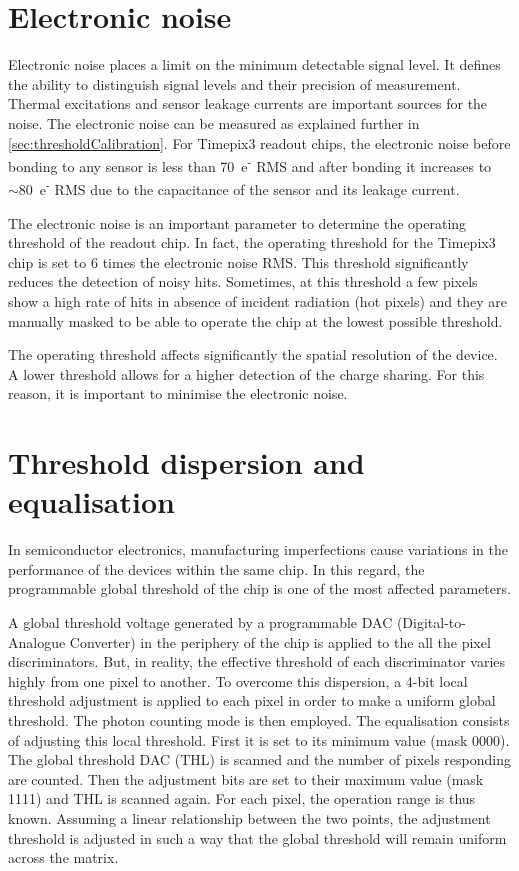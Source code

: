 \section{Electronic noise}\label{sec:noise}

Electronic noise places a limit on the minimum detectable signal
level. It defines the ability to distinguish signal levels and their
precision of measurement. Thermal excitations and sensor leakage
currents are important sources for the noise. The electronic noise can
be measured as explained further in
\cref{sec:thresholdCalibration}. For Timepix3 readout chips, the
electronic noise before bonding to any sensor is less than
70~e\textsuperscript{-} RMS and after bonding it increases to
$\sim80$~e\textsuperscript{-} RMS due to the capacitance of the sensor
and its leakage current.

The electronic noise is an important parameter to determine the
operating threshold of the readout chip. In fact, the operating
threshold for the Timepix3 chip is set to 6 times the electronic noise
RMS. This threshold significantly reduces the detection of noisy
hits. Sometimes, at this threshold a few pixels show a high rate of
hits in absence of incident radiation (hot pixels) and they are
manually masked to be able to operate the chip at the lowest possible
threshold.

The operating threshold affects significantly the spatial resolution
of the device. A lower threshold allows for a higher detection of the
charge sharing. For this reason, it is important to minimise the
electronic noise.

\section{Threshold dispersion and equalisation} 
\label{sec:ThresholdEqualisation}


In semiconductor electronics, manufacturing imperfections cause
variations in the performance of the devices within the same chip. In
this regard, the programmable global threshold of the chip is one of
the most affected parameters. 

A global threshold voltage generated by a programmable DAC
(Digital-to-Analogue Converter) in the periphery of the chip is
applied to the all the pixel discriminators. But, in reality, the
effective threshold of each discriminator varies highly from one pixel
to another. To overcome this dispersion, a 4-bit local threshold
adjustment is applied to each pixel in order to make a uniform global
threshold. The photon counting mode is then employed. The equalisation
consists of adjusting this local threshold. First it is set to its
minimum value (mask 0000). The global threshold DAC (THL) is scanned
and the number of pixels responding are counted. Then the adjustment
bits are set to their maximum value (mask 1111) and THL is scanned
again. For each pixel, the operation range is thus known. Assuming a
linear relationship between the two points, the adjustment threshold
is adjusted in such a way that the global threshold will remain
uniform across the matrix.

